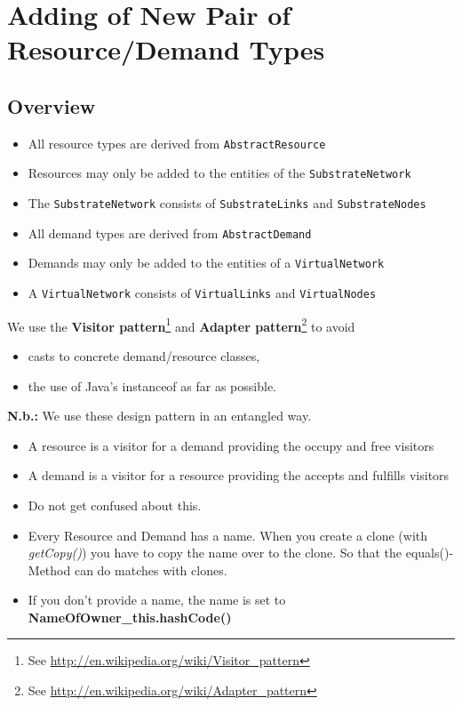 \section{Adding of New Pair of Resource/Demand Types}

\subsection{Overview}
\begin{itemize}
	\item All resource types are derived from \texttt{AbstractResource}
	\item Resources may only be added to the entities of the \texttt{SubstrateNetwork}
	\item The \texttt{SubstrateNetwork} consists of \texttt{SubstrateLinks} and \texttt{SubstrateNodes}
	\item All demand types are derived from \texttt{AbstractDemand}
	\item Demands may only be added to the entities of a \texttt{VirtualNetwork}
	\item A \texttt{VirtualNetwork} consists of \texttt{VirtualLinks} and \texttt{VirtualNodes}
\end{itemize}
We use the \textbf{Visitor pattern}\footnote{See \href{http://en.wikipedia.org/wiki/Visitor_pattern}{http://en.wikipedia.org/wiki/Visitor\_pattern}} 
and \textbf{Adapter pattern}\footnote{See \href{http://en.wikipedia.org/wiki/Adapter_pattern}{http://en.wikipedia.org/wiki/Adapter\_pattern}}  to avoid
\begin{itemize}
	\item casts to concrete demand/resource classes,
	\item the use of Java's instanceof as far as possible.
\end{itemize}
\textbf{N.b.: } We use these design pattern in an entangled way.
\begin{itemize}
	\item A resource is a visitor for a demand providing the occupy and free visitors
	\item A demand is a visitor for a resource providing the accepts and fulfills visitors
	\item Do not get confused about this.
	\item Every Resource and Demand has a name. When you create a clone (with \textsl{getCopy()}) you have to copy the name over to the clone. 
	So that the equals()-Method can do matches with clones.
	\item If you don't provide a name, the name is set to \textbf{NameOfOwner\_this.hashCode()}
\end{itemize}



